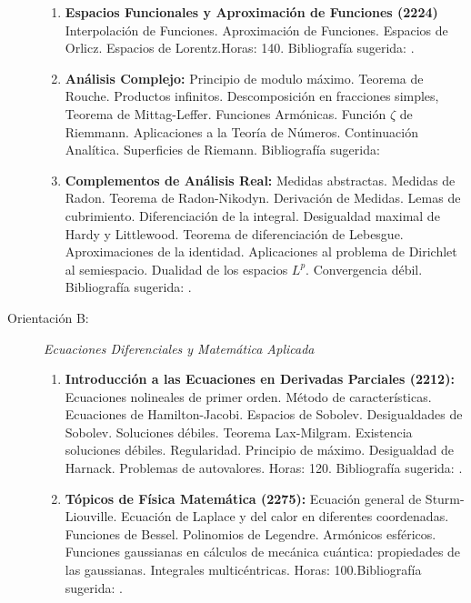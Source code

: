 \documentclass[a4paper, 12pt]{article}
\begin{document}
\begin{description}
\begin{enumerate}
\item\textbf{ Espacios Funcionales y
Aproximación de Funciones (2224)} Interpolación de Funciones. Aproximación de Funciones. Espacios de Orlicz. Espacios de Lorentz.Horas: 140. Bibliografía sugerida: \cite{KR,bennett1988interpolation,cheney}.


\item \textbf{Análisis Complejo:} Principio de modulo máximo. Teorema de
Rouche. Productos infinitos. Descomposición en fracciones simples,
Teorema de Mittag-Leffer. Funciones Armónicas. Función $\zeta$ de
Riemmann. Aplicaciones a la Teoría de Números. Continuación
Analítica. Superficies de Riemann. Bibliografía sugerida:
\cite{ahlfors,conway}

\item\textbf{Complementos de Análisis Real:} Medidas abstractas. Medidas de
Radon. Teorema de Radon-Nikodyn. Derivación de Medidas. Lemas de
cubrimiento. Diferenciación de la integral. Desigualdad maximal de
Hardy y Littlewood. Teorema de diferenciación de Lebesgue.
Aproximaciones de la identidad. Aplicaciones al problema de
Dirichlet al semiespacio. Dualidad de los espacios $L^p$.
Convergencia débil. Biblio\-grafía sugerida:
\cite{evansgariepy,favazo,rudin}.


\end{enumerate}

\item[Orientación B:] \emph{Ecuaciones Diferenciales y Matemática Aplicada}
\begin{enumerate}


\item\textbf{ Introducción a las Ecuaciones en Derivadas Parciales (2212):} Ecuaciones nolineales
de primer orden. Método de características. Ecuaciones de
Hamilton-Jacobi. Espacios de Sobolev. Desigualdades de Sobolev. Soluciones débiles. Teorema Lax-Milgram. Existencia soluciones débiles.  
Regularidad. Principio de máximo. Desigualdad de Harnack. Problemas de autovalores.  Horas: 120. Bibliografía sugerida: \cite{evans}.

\item\textbf{Tópicos de Física Matemática (2275):} Ecuación general de
Sturm-Liouville.  Ecuación de Laplace y del calor en
diferentes coordenadas. Funciones de Bessel. Polinomios de
Legendre. Armónicos esféricos. Funciones gaussianas en cálculos de
mecánica cuántica: propiedades de las gaussianas. Integrales
multicéntricas. Horas: 100.Bibliografía sugerida: \cite{alder, pinsky}.





\end{enumerate}
\end{description}
\end{document}
